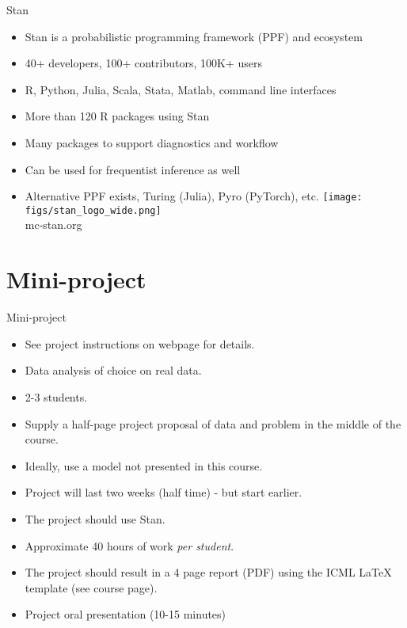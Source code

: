 \documentclass[10pt]{beamer}
\begin{document}
\begin{frame}{Stan}

\begin{itemize}
  \item Stan is a probabilistic programming framework (PPF) and ecosystem
  \item 40+ developers, 100+ contributors, 100K+ users
  \item R, Python, Julia, Scala, Stata, Matlab, command line interfaces
  \item More than 120 R packages using Stan
  \item Many packages to support diagnostics and workflow
  \item Can be used for frequentist inference as well
  \item Alternative PPF exists, Turing (Julia), Pyro (PyTorch), etc.
  \center
  \vspace{\baselineskip}
  \texttt{[image: figs/stan\_logo\_wide.png]}\\
  mc-stan.org
\end{itemize}

\end{frame}

\section{Mini-project}
\frame{\sectionpage}

\begin{frame}{Mini-project}

\begin{itemize}
\item See project instructions on webpage for details.
\item Data analysis of choice on real data.
\item 2-3 students.\pause
\item Supply a half-page project proposal of data and problem in the middle of the course.\pause
\item Ideally, use a model not presented in this course.
\item Project will last two weeks (half time) - but start earlier.
\item The project should use Stan.
\item Approximate 40 hours of work \emph{per student}.\pause
\item The project should result in a 4 page report (PDF) using the ICML LaTeX template (see course page).
\item Project oral presentation (10-15 minutes)
\end{itemize}
\end{frame}
\end{document}
